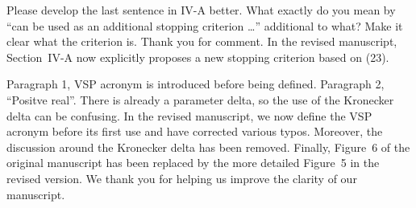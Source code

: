 \begin{rebuttal}[resolved]
    {%
        Please develop the last sentence in IV-A better. What exactly do you mean by ``can be used as an additional stopping criterion \dots'' additional to what? Make it clear what the criterion is. 
    }%
    {%
        Thank you for comment. In the revised manuscript, Section~IV-A now explicitly proposes a new stopping criterion based on (23).
    }%
\end{rebuttal}
\begin{rebuttal}[resolved]
    {%
        Paragraph 1, VSP acronym is introduced before being defined. Paragraph 2, ``Positve real''. There is already a parameter delta, so the use of the Kronecker delta can be confusing.
    }%
    {%
        In the revised manuscript, we now define the VSP acronym before its first use and have corrected various typos. Moreover, the discussion around the Kronecker delta has been removed. Finally, Figure~6 of the original manuscript has been replaced by the more detailed Figure~5 in the revised version. We thank you for helping us improve the clarity of our manuscript.
    }%
\end{rebuttal}

